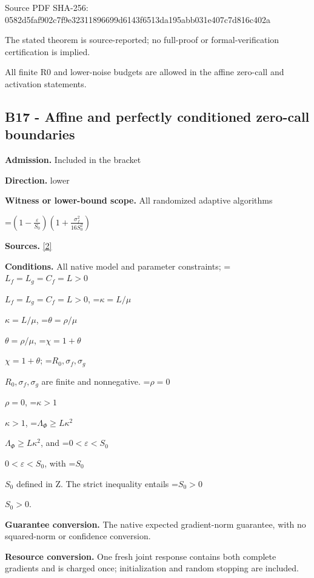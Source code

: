\documentclass[10pt,a4paper]{article}
\newcommand{\AtlasMath}[1]{\par\begingroup\centering\setbox0=\hbox{$\displaystyle #1$}\ifdim\wd0>1.4\linewidth\typeout{ATLAS WIDE FORMULA: \the\wd0}\fi\ifdim\wd0>\linewidth\resizebox{\linewidth}{!}{\box0}\else\box0\fi\par\endgroup}
\newcommand{\AtlasInlineMath}[1]{\begingroup\setbox0=\hbox{$#1$}\ifdim\wd0>.4\linewidth\endgroup\AtlasMath{#1}\else\endgroup$#1$\fi}
\begin{document}
Source PDF SHA-256: 0582d5faf902c7f9e3231189\allowbreak{}6699d6143f6513da195abb03\allowbreak{}1e407c7d816c402a



The stated theorem is source-reported; no full-proof or formal-verification certification is implied.



All finite R0 and lower-noise budgets are allowed in the affine zero-call and activation statements.



\subsection{B17 - Affine and perfectly conditioned zero-call boundaries}


\textbf{Admission.} Included in the bracket



\textbf{Direction.} lower



\textbf{Witness or lower-bound scope.} All randomized adaptive algorithms



\AtlasMath{\left(1-\frac{\varepsilon}{S_0}\right)\left(1+\frac{\sigma_f^2}{16S_0^2}\right)}


\textbf{Sources.} \href{https://github.com/WU-Wendao/Colombo/blob/main/colombo_sensorium/Complexity_altas/data/sources/colombo/SFO_JOINT_20261126/manuscript.pdf}{[2]}



\textbf{Conditions.} All native model and parameter constraints; \AtlasInlineMath{L_f=L_g=C_f=L>0}, \AtlasInlineMath{\kappa=L/\mu}, \AtlasInlineMath{\theta=\rho/\mu}, \AtlasInlineMath{\chi=1+\theta}; \AtlasInlineMath{R_0,\sigma_f,\sigma_g} are finite and nonnegative. \AtlasInlineMath{\rho=0}, \AtlasInlineMath{\kappa>1}, \AtlasInlineMath{\Lambda_\Phi\ge L\kappa^2}, and \AtlasInlineMath{0<\varepsilon<S_0}, with \AtlasInlineMath{S_0} defined in Z. The strict inequality entails \AtlasInlineMath{S_0>0}.



\textbf{Guarantee conversion.} The native expected gradient-norm guarantee, with no squared-norm or confidence conversion.



\textbf{Resource conversion.} One fresh joint response contains both complete gradients and is charged once; initialization and random stopping are included.
\end{document}
